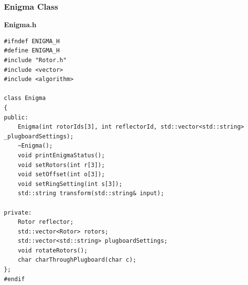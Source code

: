 \documentclass{article}
\begin{document}
\subsubsection{Enigma Class}
\textbf{Enigma.h}
\begin{lstlisting}
#ifndef ENIGMA_H
#define ENIGMA_H
#include "Rotor.h"
#include <vector>
#include <algorithm>

class Enigma
{
public:
	Enigma(int rotorIds[3], int reflectorId, std::vector<std::string> _plugboardSettings);
	~Enigma();
	void printEnigmaStatus();
	void setRotors(int r[3]);
	void setOffset(int o[3]);
	void setRingSetting(int s[3]);
	std::string transform(std::string& input);
	
private:
	Rotor reflector;
	std::vector<Rotor> rotors;
	std::vector<std::string> plugboardSettings;
	void rotateRotors();
	char charThroughPlugboard(char c);
};
#endif
\end{lstlisting}
\end{document}
